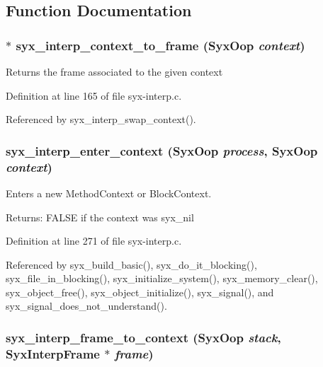 \subsection{Function Documentation}
\hypertarget{syx-interp_8c_2fe6a5f292ce5d9ab3103878b6d3d7cf}{
\subsubsection{$\ast$ syx\_\-interp\_\-context\_\-to\_\-frame ({\bf SyxOop} {\em context})}}
\label{syx-interp_8c_2fe6a5f292ce5d9ab3103878b6d3d7cf}


Returns the frame associated to the given context 

Definition at line 165 of file syx-interp.c.

Referenced by syx\_\-interp\_\-swap\_\-context().\hypertarget{syx-interp_8c_e483ac8c92a367fc44460969715106d9}{
\subsubsection{ syx\_\-interp\_\-enter\_\-context ({\bf SyxOop} {\em process}, \/  {\bf SyxOop} {\em context})}}
\label{syx-interp_8c_e483ac8c92a367fc44460969715106d9}


Enters a new MethodContext or BlockContext.

\begin{Desc}
\item[Returns:]FALSE if the context was syx\_\-nil \end{Desc}


Definition at line 271 of file syx-interp.c.

Referenced by syx\_\-build\_\-basic(), syx\_\-do\_\-it\_\-blocking(), syx\_\-file\_\-in\_\-blocking(), syx\_\-initialize\_\-system(), syx\_\-memory\_\-clear(), syx\_\-object\_\-free(), syx\_\-object\_\-initialize(), syx\_\-signal(), and syx\_\-signal\_\-does\_\-not\_\-understand().\hypertarget{syx-interp_8c_f8844c877ec9281208ea602d73880c0f}{
\subsubsection{ syx\_\-interp\_\-frame\_\-to\_\-context ({\bf SyxOop} {\em stack}, \/  {\bf SyxInterpFrame} $\ast$ {\em frame})}}
\label{syx-interp_8c_f8844c877ec9281208ea602d73880c0f}



